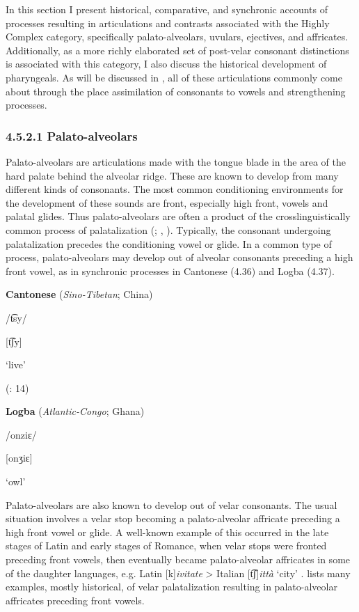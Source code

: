   In this section I present historical, comparative, and synchronic accounts of processes resulting in articulations and contrasts associated with the Highly Complex category, specifically palato-alveolars, uvulars, ejectives, and affricates. Additionally, as a more richly elaborated set of post-velar consonant distinctions is associated with this category, I also discuss the historical development of pharyngeals. As will be discussed in , all of these articulations commonly come about through the place assimilation of consonants to vowels and strengthening processes.

\subsubsection{\textbf{4.5.2.1} \textbf{Palato-alveolars}}

  Palato-alveolars are articulations made with the tongue blade in the area of the hard palate behind the alveolar ridge. These are known to develop from many different kinds of consonants. The most common conditioning environments for the development of these sounds are front, especially high front, vowels and palatal glides. Thus palato-alveolars are often a product of the crosslinguistically common process of palatalization (\citealt{Bhat1978}; \citealt{Bateman2007}, \citealt{BybeeEasterday2019}). Typically, the consonant undergoing palatalization precedes the conditioning vowel or glide. In a common type of process, palato-alveolars may develop out of alveolar consonants preceding a high front vowel, as in synchronic processes in Cantonese (4.36) and Logba (4.37).

\ea\label{ex:(4.36)}
  \textbf{Cantonese} (\textit{Sino-Tibetan}; China)

/t͡sy/

[t͡ʃy]

‘live’

(\citealt{MatthewsYip1994}: 14)

\z

\ea\label{ex:(4.37)}
  \textbf{Logba} (\textit{Atlantic-Congo}; Ghana)

/onziɛ/

[onʒiɛ]

‘owl’

\citep[18]{Dorvlo2008}

\z

  Palato-alveolars are also known to develop out of velar consonants. The usual situation involves a velar stop becoming a palato-alveolar affricate preceding a high front vowel or glide. A well-known example of this occurred in the late stages of Latin and early stages of Romance, when velar stops were fronted preceding front vowels, then eventually became palato-alveolar affricates in some of the daughter languages, e.g. Latin [k]\textit{ivitate} > Italian [t͡ʃ]\textit{ittà} ‘city’ \citep[113]{Posner1996}. \citet{Bhat1978} lists many examples, mostly historical, of velar palatalization resulting in palato-alveolar affricates preceding front vowels.

